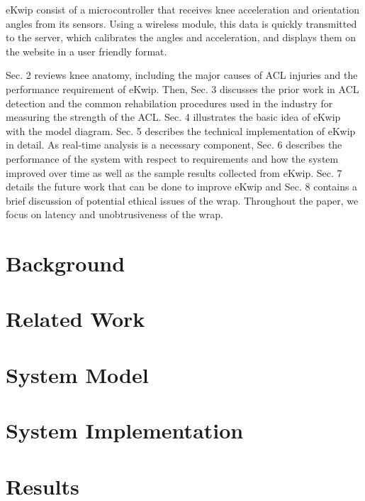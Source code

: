 \documentclass{sig-alternate}
\begin{document}
eKwip consist of a microcontroller that receives knee acceleration and orientation angles from its sensors. Using a wireless module, this data is quickly transmitted to the server, which calibrates the angles and acceleration, and displays them on the website in a user friendly format.

Sec. 2 reviews knee anatomy, including the major causes of ACL injuries and the performance requirement of eKwip. Then, Sec. 3 discusses the prior work in ACL detection and the common rehabilation procedures used in the industry for measuring the strength of the ACL. Sec. 4 illustrates the basic idea of eKwip with the model diagram. Sec. 5 describes the technical implementation of eKwip in detail. As real-time analysis is a necessary component, Sec. 6 describes the performance of the system with respect to requirements and how the system improved over time as well as the sample results collected from eKwip. Sec. 7 details the future work that can be done to improve eKwip and Sec. 8 contains a brief discussion of potential ethical issues of the wrap. Throughout the paper, we focus on latency and unobtrusiveness of the wrap.

\section{Background}
\label{sec:background}


\section{Related Work}
\label{sec:related_work}


\section{System Model}
\label{sec:system_model}


\section{System Implementation}
\label{sec:system_implementation}


\section{Results}
\label{sec:results}

\end{document}
